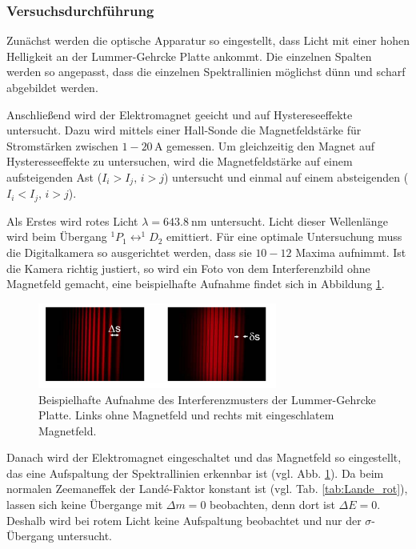 \subsubsection{Versuchsdurchführung}
Zunächst werden die optische Apparatur so eingestellt, dass Licht mit einer hohen Helligkeit %
an der Lummer-Gehrcke Platte ankommt. Die einzelnen Spalten werden so angepasst, dass die %
einzelnen Spektrallinien möglichst dünn und scharf abgebildet werden.

Anschließend wird der Elektromagnet geeicht und auf Hystereseeffekte untersucht.
Dazu wird mittels einer Hall-Sonde die Magnetfeldstärke für Stromstärken
zwischen $\num{1}-\num{20}\,\si{\ampere}$ gemessen. Um gleichzeitig den Magnet auf Hysteresseeffekte zu untersuchen,
wird die Magnetfeldstärke auf einem aufsteigenden Ast ($I_i>I_j,\, i>j$) untersucht und einmal auf einem absteigenden ($I_i<I_j,\, i>j$).

Als Erstes wird rotes Licht $\lambda = \SI{643.8}{\nano\meter}$ untersucht.
Licht dieser Wellenlänge wird beim Übergang $^1P_1\leftrightarrow ^1\!\!D_2$ emittiert.
Für eine optimale Untersuchung muss die Digitalkamera so ausgerichtet werden, dass sie $10-12$ Maxima aufnimmt.
Ist die Kamera richtig justiert, so wird ein Foto von dem Interferenzbild ohne Magnetfeld gemacht, eine beispielhafte Aufnahme
findet sich in Abbildung \ref{fig: bsp_foto}.
\FloatBarrier
\begin{figure}[h]
  \centering
  \includegraphics[width=0.7\textwidth]{pics/bsp_foto.png}
  \caption{Beispielhafte Aufnahme des Interferenzmusters der Lummer-Gehrcke Platte. %
  Links ohne Magnetfeld und rechts mit eingeschlatem Magnetfeld\cite{anleitung27}.}
  \label{fig: bsp_foto}
\end{figure}
\FloatBarrier
Danach wird der Elektromagnet eingeschaltet und das Magnetfeld so eingestellt, das eine Aufspaltung der
Spektrallinien erkennbar ist (vgl. Abb. \ref{fig: bsp_foto}). Da beim normalen Zeemaneffek
der Landé-Faktor konstant ist (vgl. Tab. \ref{tab:Lande_rot}), lassen sich keine %
Übergange mit $\Delta m=0$ beobachten, denn dort ist $\Delta E=0$. Deshalb wird bei rotem Licht keine Aufspaltung
beobachtet und nur der $\sigma$- Übergang untersucht.  %


